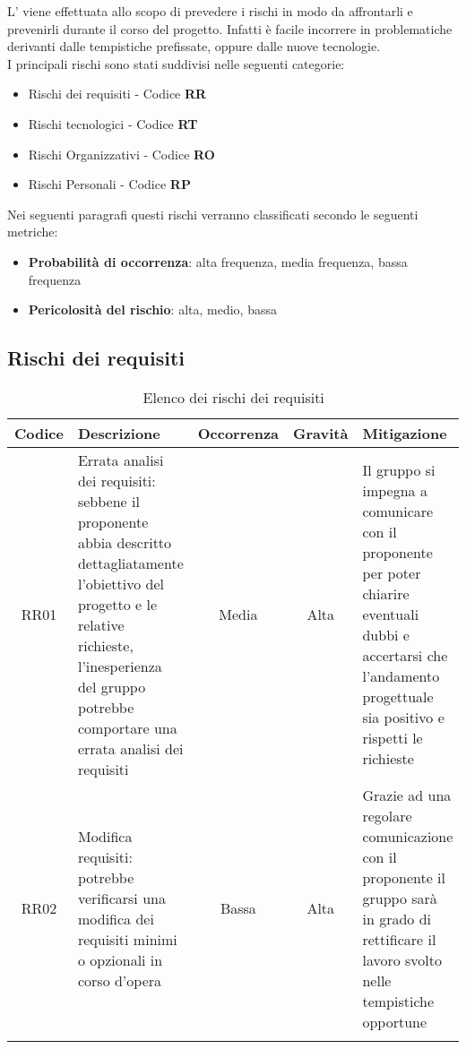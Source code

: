 \documentclass[../piano_di_progetto.tex]{subfiles}
\begin{document}
L’  viene effettuata allo scopo di prevedere i rischi in modo da affrontarli e prevenirli durante il corso del progetto. Infatti è facile incorrere in problematiche derivanti dalle tempistiche prefissate, oppure dalle nuove tecnologie.\\

I principali rischi sono stati suddivisi nelle seguenti categorie:
\begin{itemize}
	\item Rischi dei requisiti - Codice \textbf{RR}
	\item Rischi tecnologici  - Codice \textbf{RT}
	\item Rischi Organizzativi - Codice \textbf{RO}
	\item Rischi Personali - Codice \textbf{RP}
\end{itemize}
Nei seguenti paragrafi questi rischi verranno classificati secondo le seguenti metriche:
\begin{itemize}
	\item \textbf{Probabilità di occorrenza}: alta frequenza, media frequenza, bassa frequenza
	\item \textbf{Pericolosità del rischio}: alta, medio, bassa
\end{itemize}

\subsection{Rischi dei requisiti}%
\label{sub:rischi_req}

\begin{center}
	\begin{longtable}{|c|p{4.5cm}|c|c|p{4.5cm}|}
		\hline
		\rowcolor{lightgray}
		{\textbf{Codice}} & {\textbf{Descrizione}} & {\textbf{Occorrenza}} & {\textbf{Gravità}} & {\textbf{Mitigazione}}                                                     \\

		\hline
		RR01              &
		Errata analisi dei requisiti: sebbene il proponente abbia descritto dettagliatamente l’obiettivo del progetto e le relative richieste, l’inesperienza del gruppo potrebbe comportare una errata analisi dei requisiti
		                  &
		Media
		                  &
		Alta
		                  &
		Il gruppo si impegna a comunicare con il proponente per poter chiarire eventuali dubbi e accertarsi che l’andamento progettuale sia positivo e rispetti le richieste \\

		RR02              &
		Modifica requisiti: potrebbe verificarsi una modifica dei requisiti minimi o opzionali in corso d’opera
		                  &
		Bassa
		                  &
		Alta
		                  &
		Grazie ad una regolare comunicazione con il proponente il gruppo sarà in grado di rettificare il lavoro svolto nelle tempistiche opportune                           \\
		\hline
		\rowcolor{white}
		\caption{Elenco dei rischi dei requisiti}
	\end{longtable}

\end{center}
\end{document}
